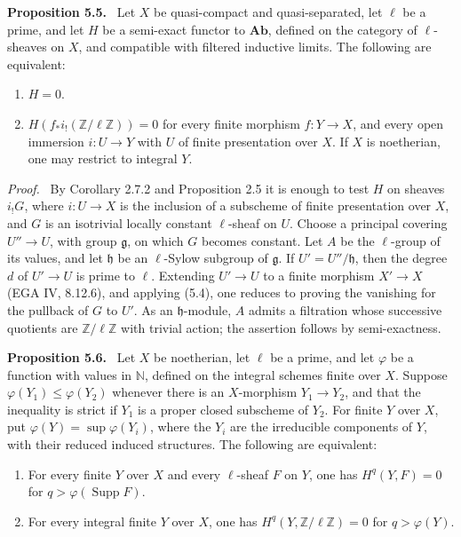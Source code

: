 \documentclass[11pt]{article}
\newcommand{\Zz}{\mathbb{Z}}
\newcommand{\Nn}{\mathbb{N}}
\newenvironment{statement}[1]{\par\medskip\noindent\textbf{#1.}\ }{\par\medskip}
\newenvironment{prooftext}{\par\noindent\emph{Proof.}\ }{\par\medskip}
\begin{document}
\begin{statement}{Proposition 5.5}
Let \(X\) be quasi-compact and quasi-separated, let \(\ell\) be a prime, and let \(H\) be a semi-exact functor to \(\mathbf{Ab}\), defined on the category of \(\ell\)-sheaves on \(X\), and compatible with filtered inductive limits. The following are equivalent:
\begin{enumerate}[label=(\roman*)]
\item \(H=0\).
\item \(H(f_*i_!(\Zz/\ell\Zz))=0\) for every finite morphism \(f:Y\to X\), and every open immersion \(i:U\to Y\) with \(U\) of finite presentation over \(X\). If \(X\) is noetherian, one may restrict to integral \(Y\).
\end{enumerate}
\end{statement}

\begin{prooftext}
By Corollary 2.7.2 and Proposition 2.5 it is enough to test \(H\) on sheaves \(i_!G\), where \(i:U\to X\) is the inclusion of a subscheme of finite presentation over \(X\), and \(G\) is an isotrivial locally constant \(\ell\)-sheaf on \(U\). Choose a principal covering \(U''\to U\), with group \(\mathfrak g\), on which \(G\) becomes constant. Let \(A\) be the \(\ell\)-group of its values, and let \(\mathfrak h\) be an \(\ell\)-Sylow subgroup of \(\mathfrak g\). If \(U'=U''/\mathfrak h\), then the degree \(d\) of \(U'\to U\) is prime to \(\ell\). Extending \(U'\to U\) to a finite morphism \(X'\to X\) (EGA IV, 8.12.6), and applying (5.4), one reduces to proving the vanishing for the pullback of \(G\) to \(U'\). As an \(\mathfrak h\)-module, \(A\) admits a filtration whose successive quotients are \(\Zz/\ell\Zz\) with trivial action; the assertion follows by semi-exactness.
\end{prooftext}

\begin{statement}{Proposition 5.6}
Let \(X\) be noetherian, let \(\ell\) be a prime, and let \(\varphi\) be a function with values in \(\Nn\), defined on the integral schemes finite over \(X\). Suppose \(\varphi(Y_1)\leq\varphi(Y_2)\) whenever there is an \(X\)-morphism \(Y_1\to Y_2\), and that the inequality is strict if \(Y_1\) is a proper closed subscheme of \(Y_2\). For finite \(Y\) over \(X\), put \(\varphi(Y)=\sup\varphi(Y_i)\), where the \(Y_i\) are the irreducible components of \(Y\), with their reduced induced structures. The following are equivalent:
\begin{enumerate}[label=(\roman*)]
\item For every finite \(Y\) over \(X\) and every \(\ell\)-sheaf \(F\) on \(Y\), one has \(H^q(Y,F)=0\) for \(q>\varphi(\operatorname{Supp}F)\).
\item For every integral finite \(Y\) over \(X\), one has \(H^q(Y,\Zz/\ell\Zz)=0\) for \(q>\varphi(Y)\).
\end{enumerate}
\end{statement}
\end{document}
